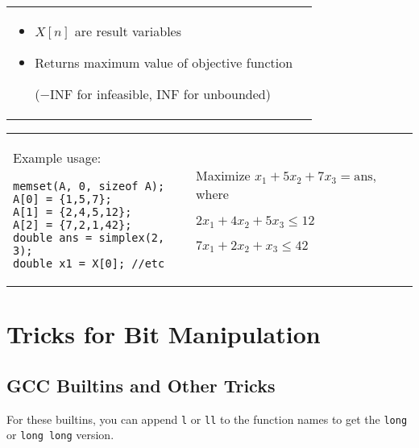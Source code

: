 \documentclass[letterpaper]{article}
\begin{document}
\begin{tabular}{@{}p{9cm}p{9cm}@{}}
\begin{itemize}
(0 for objective function)
\item $X[n]$ are result variables
\item Returns maximum value of objective function

($-\mathrm{INF}$ for infeasible, INF for unbounded)
\end{itemize}
\end{tabular}

\begin{tabular}{@{}p{5cm}p{9cm}@{}}
Example usage:
\begin{lstlisting}
memset(A, 0, sizeof A);
A[0] = {1,5,7};
A[1] = {2,4,5,12};
A[2] = {7,2,1,42};
double ans = simplex(2, 3);
double x1 = X[0]; //etc
\end{lstlisting}
&
Maximize $x_1+5x_2+7x_3=\mathrm{ans}$, where

$2x_1+4x_2+5x_3\leq12$

$7x_1+2x_2+x_3\leq42$
\end{tabular}

\clearpage

\section{Tricks for Bit Manipulation}

\subsection{GCC Builtins and Other Tricks}

For these builtins, you can append \texttt{l} or \texttt{ll} to the function names to get the \texttt{long} or \texttt{long long} version.
\end{document}
